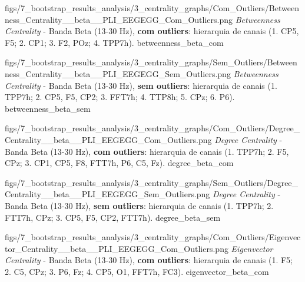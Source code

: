 
\ultrawidefigure
  {figs/7_bootstrap_results_analysis/3_centrality_graphs/Com_Outliers/Betweenness_Centrality__beta__PLI_EEGEGG_Com_Outliers.png}
  {\textit{Betweenness Centrality} - Banda Beta (13-30 Hz), \textbf{com outliers}: hierarquia de canais (1. CP5, F5; 2. CP1; 3. F2, POz; 4. TPP7h).}
  {betweenness_beta_com}

\ultrawidefigure
  {figs/7_bootstrap_results_analysis/3_centrality_graphs/Sem_Outliers/Betweenness_Centrality__beta__PLI_EEGEGG_Sem_Outliers.png}
  {\textit{Betweenness Centrality} - Banda Beta (13-30 Hz), \textbf{sem outliers}: hierarquia de canais (1. TPP7h; 2. CP5, F5, CP2; 3. FFT7h; 4. TTP8h; 5. CPz; 6. P6).}
  {betweenness_beta_sem}


\ultrawidefigure
  {figs/7_bootstrap_results_analysis/3_centrality_graphs/Com_Outliers/Degree_Centrality__beta__PLI_EEGEGG_Com_Outliers.png}
  {\textit{Degree Centrality} - Banda Beta (13-30 Hz), \textbf{com outliers}: hierarquia de canais (1. TPP7h; 2. F5, CPz; 3. CP1, CP5, F8, FTT7h, P6, C5, Fz).}
  {degree_beta_com}

\ultrawidefigure
  {figs/7_bootstrap_results_analysis/3_centrality_graphs/Sem_Outliers/Degree_Centrality__beta__PLI_EEGEGG_Sem_Outliers.png}
  {\textit{Degree Centrality} - Banda Beta (13-30 Hz), \textbf{sem outliers}: hierarquia de canais (1. TPP7h; 2. FTT7h, CPz; 3. CP5, F5, CP2, FTT7h).}
  {degree_beta_sem}


\ultrawidefigure
  {figs/7_bootstrap_results_analysis/3_centrality_graphs/Com_Outliers/Eigenvector_Centrality__beta__PLI_EEGEGG_Com_Outliers.png}
  {\textit{Eigenvector Centrality} - Banda Beta (13-30 Hz), \textbf{com outliers}: hierarquia de canais (1. F5; 2. C5, CPz; 3. P6, Fz; 4. CP5, O1, FFT7h, FC3).}
  {eigenvector_beta_com}


